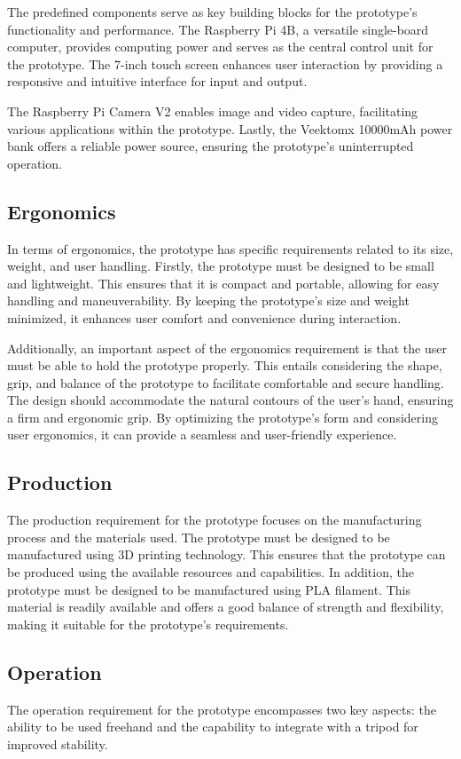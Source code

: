 The predefined components serve as key building blocks for the prototype's functionality and performance. The Raspberry Pi 4B, a versatile single-board computer, provides computing power and serves as the central control unit for the prototype. The 7-inch touch screen enhances user interaction by providing a responsive and intuitive interface for input and output.

The Raspberry Pi Camera V2 enables image and video capture, facilitating various applications within the prototype. Lastly, the Veektomx 10000mAh power bank offers a reliable power source, ensuring the prototype's uninterrupted operation.

\subsection{Ergonomics}
In terms of ergonomics, the prototype has specific requirements related to its size, weight, and user handling. Firstly, the prototype must be designed to be small and lightweight. This ensures that it is compact and portable, allowing for easy handling and maneuverability. By keeping the prototype's size and weight minimized, it enhances user comfort and convenience during interaction.

Additionally, an important aspect of the ergonomics requirement is that the user must be able to hold the prototype properly. This entails considering the shape, grip, and balance of the prototype to facilitate comfortable and secure handling. The design should accommodate the natural contours of the user's hand, ensuring a firm and ergonomic grip. By optimizing the prototype's form and considering user ergonomics, it can provide a seamless and user-friendly experience.

\subsection{Production}
The production requirement for the prototype focuses on the manufacturing process and the materials used. The prototype must be designed to be manufactured using 3D printing technology. This ensures that the prototype can be produced using the available resources and capabilities. In addition, the prototype must be designed to be manufactured using PLA filament. This material is readily available and offers a good balance of strength and flexibility, making it suitable for the prototype's requirements.

\subsection{Operation}
The operation requirement for the prototype encompasses two key aspects: the ability to be used freehand and the capability to integrate with a tripod for improved stability.


